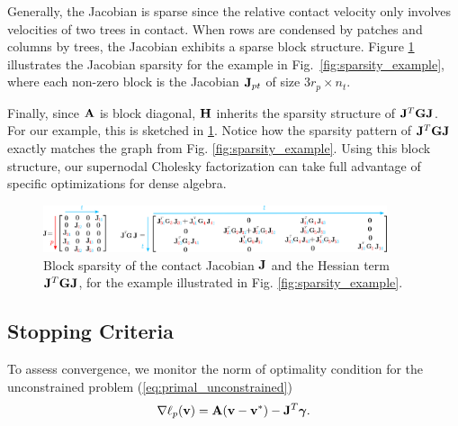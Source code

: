 Generally, the Jacobian is sparse since the relative contact velocity only
involves velocities of two trees in contact. When rows are condensed by patches
and columns by trees, the Jacobian exhibits a sparse block structure. Figure
\ref{fig:JTGJ_schematic} illustrates the Jacobian sparsity for the example in
Fig.~\ref{fig:sparsity_example}, where each non-zero block is the Jacobian
${\mathbf{J}}_{pt}$ of size $3r_p\times n_t$.

Finally, since ${\mathbf{A}}$ is block diagonal, ${\mathbf{H}}$ inherits the sparsity
structure of ${\mathbf{J}}^T{\mathbf{G}}{\mathbf{J}}$. For our example, this is sketched in
\ref{fig:JTGJ_schematic}. Notice how the sparsity pattern of
${\mathbf{J}}^T{\mathbf{G}}{\mathbf{J}}$ exactly matches the graph from Fig.
\ref{fig:sparsity_example}. Using this block structure, our supernodal Cholesky
factorization can take full advantage of specific optimizations for dense
algebra.
\begin{figure}[!h]
	\centering
	\includegraphics[width=0.9\textwidth]{figures/schematics/jacobian_and_JTGJ.png}
	\caption{\label{fig:JTGJ_schematic} 
	Block sparsity of the contact Jacobian ${\mathbf{J}}$ and the Hessian term
	${\mathbf{J}}^T{\mathbf{G}}{\mathbf{J}}$, for the example illustrated in Fig.
	\ref{fig:sparsity_example}.}
\end{figure}

\subsection{Stopping Criteria}
\label{sec:stopping_criteria}

To assess convergence, we monitor the norm of optimality condition for the
unconstrained problem (\ref{eq:primal_unconstrained})
\begin{equation*}
	\nabla\ell_p({\mathbf{v}}) = {\mathbf{A}}({\mathbf{v}}-{\mathbf{v}}^*) - {\mathbf{J}}^T{\bm\gamma}.
\end{equation*}

